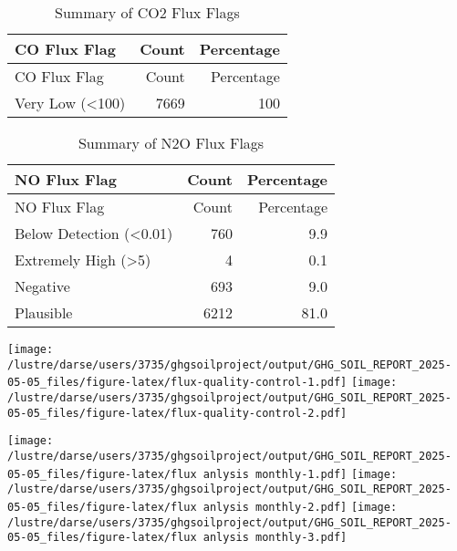 \documentclass[
]{article}
\begin{document}
\begin{longtable}[]{@{}lrr@{}}
\caption{Summary of CO2 Flux Flags}\tabularnewline
\toprule()
CO Flux Flag & Count & Percentage \\
\midrule()
\endfirsthead
\toprule()
CO Flux Flag & Count & Percentage \\
\midrule()
\endhead
Very Low (\textless100) & 7669 & 100 \\
\bottomrule()
\end{longtable}

\begin{longtable}[]{@{}lrr@{}}
\caption{Summary of N2O Flux Flags}\tabularnewline
\toprule()
NO Flux Flag & Count & Percentage \\
\midrule()
\endfirsthead
\toprule()
NO Flux Flag & Count & Percentage \\
\midrule()
\endhead
Below Detection (\textless0.01) & 760 & 9.9 \\
Extremely High (\textgreater5) & 4 & 0.1 \\
Negative & 693 & 9.0 \\
Plausible & 6212 & 81.0 \\
\bottomrule()
\end{longtable}

\texttt{[image: /lustre/darse/users/3735/ghgsoilproject/output/GHG\_SOIL\_REPORT\_2025-05-05\_files/figure-latex/flux-quality-control-1.pdf]}
\texttt{[image: /lustre/darse/users/3735/ghgsoilproject/output/GHG\_SOIL\_REPORT\_2025-05-05\_files/figure-latex/flux-quality-control-2.pdf]}

\texttt{[image: /lustre/darse/users/3735/ghgsoilproject/output/GHG\_SOIL\_REPORT\_2025-05-05\_files/figure-latex/flux anlysis monthly-1.pdf]}
\texttt{[image: /lustre/darse/users/3735/ghgsoilproject/output/GHG\_SOIL\_REPORT\_2025-05-05\_files/figure-latex/flux anlysis monthly-2.pdf]}
\texttt{[image: /lustre/darse/users/3735/ghgsoilproject/output/GHG\_SOIL\_REPORT\_2025-05-05\_files/figure-latex/flux anlysis monthly-3.pdf]}
\end{document}
